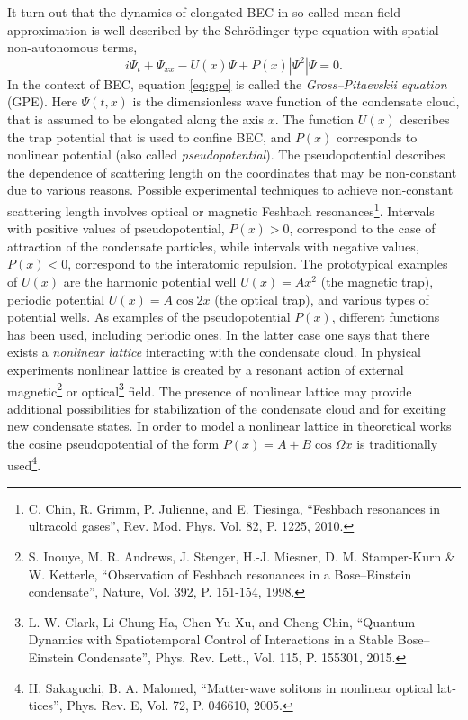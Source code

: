 \documentclass[candidate, href, colorlinks]{disser}
\begin{document}
It turn out that the dynamics of elongated BEC in so-called mean-field approximation is well described by the Schr\"odinger type equation with spatial non-autonomous terms,
\begin{equation}
	i \Psi_t + \Psi_{xx} - U(x) \Psi + P(x) |\Psi^2| \Psi = 0.
\label{eq:gpe}
\end{equation}
In the context of BEC, equation \eqref{eq:gpe} is called the {\it Gross--Pitaevskii equation} (GPE).
Here $\Psi(t, x)$ is the dimensionless wave function of the condensate cloud, that is assumed to be elongated along the axis $x$.
The function $U(x)$ describes the trap potential that is used to confine BEC, and $P(x)$ corresponds to nonlinear potential (also called {\it pseudopotential}).
The pseudopotential describes the dependence of scattering length on the coordinates that may be non-constant due to various reasons.
Possible experimental techniques to achieve non-constant scattering length involves optical or magnetic Feshbach resonances\footnote{C. Chin, R. Grimm, P. Julienne, and E. Tiesinga, ``Feshbach resonances in ultracold gases'', Rev. Mod. Phys. Vol. 82, P. 1225, 2010.}.
Intervals with positive values of pseudopotential, $P(x) > 0$, correspond to the case of attraction of the condensate particles, while intervals with negative values, $P(x) < 0$, correspond to the interatomic repulsion.
The prototypical examples of $U(x)$ are the harmonic potential well $U(x) = Ax^2$ (the magnetic trap), periodic potential $U(x) = A \cos 2x$ (the optical trap), and various types of potential wells.
%
As examples of the pseudopotential $P(x)$, different functions has been used, including periodic ones.
In the latter case one says that there exists a {\it nonlinear lattice} interacting with the condensate cloud.
In physical experiments nonlinear lattice is created by a resonant action of external magnetic\footnote{S. Inouye, M. R. Andrews, J. Stenger, H.-J. Miesner, D. M. Stamper-Kurn \& W. Ketterle, ``Observation of Feshbach resonances in a Bose--Einstein condensate'', Nature, Vol. 392, P. 151-154, 1998.} or optical\footnote{L. W. Clark, Li-Chung Ha, Chen-Yu Xu, and Cheng Chin, ``Quantum Dynamics with Spatiotemporal Control of Interactions in a Stable Bose--Einstein Condensate'', Phys. Rev. Lett., Vol. 115, P. 155301, 2015.} field.
The presence of nonlinear lattice may provide additional possibilities for stabilization of the condensate cloud and for exciting new condensate states.
In order to model a nonlinear lattice in theoretical works the cosine pseudopotential of the form $P(x) = A + B \cos \Omega x$ is traditionally used\footnote{\label{note:malomed} H. Sakaguchi,  B. A. Malomed, ``Matter-wave solitons in nonlinear optical lat­tices'', Phys. Rev. E, Vol. 72, P. 046610, 2005.}.
\end{document}
